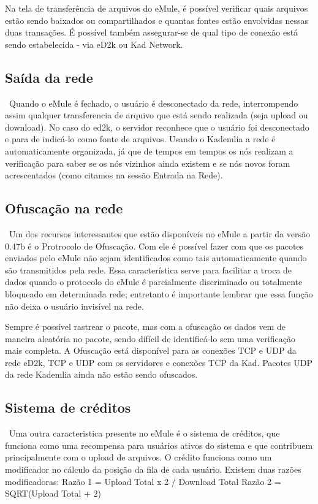 \documentclass[a4paper]{article}
\begin{document}
        Na tela de transferência de arquivos do eMule, é possível verificar quais arquivos estão sendo baixados ou compartilhados e quantas fontes estão envolvidas nessas duas transações. É possível também assegurar-se de qual tipo de conexão está sendo estabelecida - via eD2k ou Kad Network.

	\subsection{Saída da rede}\
	Quando o eMule é fechado, o usuário é desconectado da rede, interrompendo assim qualquer transferencia de arquivo que está sendo realizada (seja upload ou download). No caso do ed2k, o servidor reconhece que o usuário foi desconectado e para de indicá-lo como fonte de arquivos. Usando o Kademlia a rede é automaticamente organizada, já que de tempos em tempos os nós realizam a verificação para saber se os nós vizinhos ainda existem e se nós novos foram acrescentados (como citamos na sessão Entrada na Rede).
    
 	\subsection{Ofuscação na rede}\
	Um dos recursos interessantes que estão disponíveis no eMule a partir da versão 0.47b é o Protrocolo de  Ofuscação. Com ele é possível fazer com que os pacotes enviados pelo eMule não sejam identificados como tais automaticamente quando são transmitidos pela rede. Essa característica serve para facilitar a troca de dados quando o protocolo do eMule é parcialmente discriminado ou totalmente bloqueado em determinada rede; entretanto é importante lembrar que essa função não deixa o usuário invisível na rede. 
    
    Sempre é possível rastrear o pacote, mas com a ofuscação os dados vem de maneira aleatória no pacote, sendo difícil de identificá-lo sem uma verificação mais completa. A Ofuscação está disponível para as conexões TCP e UDP da rede eD2k, TCP e UDP com os servidores e conexões TCP da Kad. Pacotes UDP da rede Kademlia ainda não estão sendo ofuscados. 
    \subsection
    {Sistema de créditos}\
    Uma outra caracteristica presente no eMule é o sistema de créditos, que funciona como uma recompensa para usuários ativos do sistema e que contribuem principalmente com o upload de arquivos. O crédito funciona como um modificador no cálculo da posição da fila de cada usuário. Existem duas razões modificadoras: 
    Razão 1 = Upload Total x 2 / Download Total
  	Razão 2 = SQRT(Upload Total + 2)
    
\end{document}
